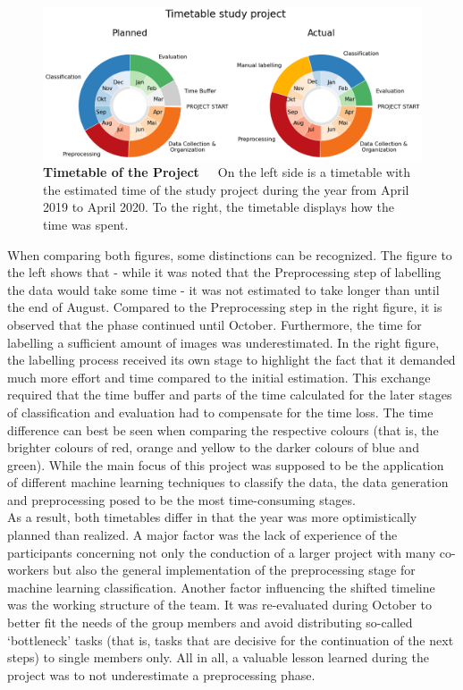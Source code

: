 \begin{figure}[h]
	\centering
	\includegraphics[scale=0.36]{Figures/chapter02/timetable}
	\decoRule
	\caption[Timetable of the Project]{\textbf{Timetable of the Project}~~~On the left side is a timetable with the estimated time of the study project during the year from April 2019 to April 2020. To the right, the timetable displays how the time was spent.}
	\label{fig:Timetable}
\end{figure}

When comparing both figures, some distinctions can be recognized. The figure to the left shows that - while it was noted that the Preprocessing step of labelling the data would take some time - it was not estimated to take longer than until the end of August. Compared to the Preprocessing step in the right figure, it is observed that the phase continued until October. Furthermore, the time for labelling a sufficient amount of images was underestimated. In the right figure, the labelling process received its own stage to highlight the fact that it demanded much more effort and time compared to the initial estimation.
This exchange required that the time buffer and parts of the time calculated for the later stages of classification and evaluation had to compensate for the time loss.
The time difference can best be seen when comparing the respective colours (that is, the brighter colours of red, orange and yellow to the darker colours of blue and green). While the main focus of this project was supposed to be the application of different machine learning techniques to classify the data, the data generation and preprocessing posed to be the most time-consuming stages. \\
As a result, both timetables differ in that the year was more optimistically planned than realized. A major factor was the lack of experience of the participants concerning not only the conduction of a larger project with many co-workers but also the general implementation of the preprocessing stage for machine learning classification. Another factor influencing the shifted timeline was the working structure of the team. It was re-evaluated during October to better fit the needs of the group members and avoid distributing so-called ‘bottleneck’ tasks (that is, tasks that are decisive for the continuation of the next steps) to single members only. All in all, a valuable lesson learned during the project was to not underestimate a preprocessing phase. \\

